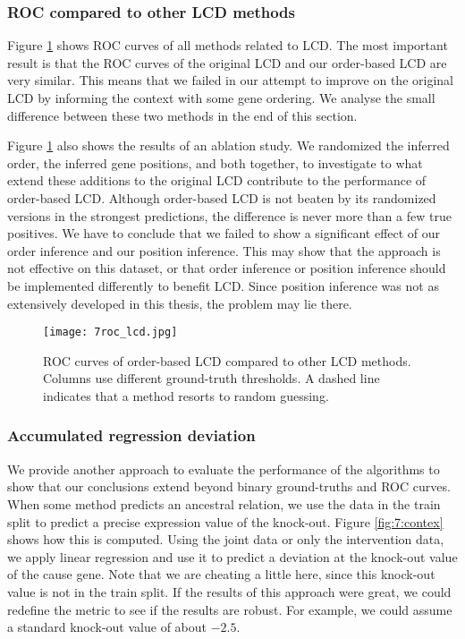 \subsubsection{ROC compared to other LCD methods}

Figure \ref{fig:7:roclcd} shows ROC curves of all methods related to LCD. The most important result is that the ROC curves of the original LCD and our order-based LCD are very similar. This means that we failed in our attempt to improve on the original LCD by informing the context with some gene ordering. We analyse the small difference between these two methods in the end of this section.

Figure \ref{fig:7:roclcd} also shows the results of an ablation study. We randomized the inferred order, the inferred gene positions, and both together, to investigate to what extend these additions to the original LCD contribute to the performance of order-based LCD. Although order-based LCD is not beaten by its randomized versions in the strongest predictions, the difference is never more than a few true positives. We have to conclude that we failed to show a significant effect of our order inference and our position inference. This may show that the approach is not effective on this dataset, or that order inference or position inference should be implemented differently to benefit LCD. Since position inference was not as extensively developed in this thesis, the problem may lie there.

\begin{figure}[h]
    \centering
    \texttt{[image: 7roc\_lcd.jpg]}
    \caption{ROC curves of order-based LCD compared to other LCD methods. Columns use different ground-truth thresholds. A dashed line indicates that a method resorts to random guessing.}
    \label{fig:7:roclcd}
\end{figure}

\subsubsection{Accumulated regression deviation}

We provide another approach to evaluate the performance of the algorithms to show that our conclusions extend beyond binary ground-truths and ROC curves. When some method predicts an ancestral relation, we use the data in the train split to predict a precise expression value of the knock-out. Figure \ref{fig:7:contex} shows how this is computed. Using the joint data or only the intervention data, we apply linear regression and use it to predict a deviation at the knock-out value of the cause gene. Note that we are cheating a little here, since this knock-out value is not in the train split. If the results of this approach were great, we could redefine the metric to see if the results are robust. For example, we could assume a standard knock-out value of about $-2.5$.

